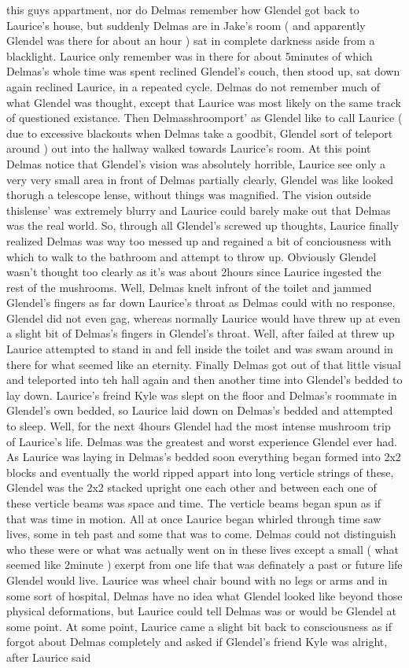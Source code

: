 \documentclass[12pt]{book}
\begin{document}
this guys appartment, nor do Delmas remember how Glendel got back to Laurice's house, but suddenly Delmas are in Jake's room ( and apparently Glendel was there for about an hour ) sat in complete darkness aside from a blacklight. Laurice only remember was in there for about 5minutes of which Delmas's whole time was spent reclined Glendel's couch, then stood up, sat down again reclined Laurice, in a repeated cycle. Delmas do not remember much of what Glendel was thought, except that Laurice was most likely on the same track of questioned existance. Then Delmasshroomport' as Glendel like to call Laurice ( due to excessive blackouts when Delmas take a goodbit, Glendel sort of teleport around ) out into the hallway walked towards Laurice's room. At this point Delmas notice that Glendel's vision was absolutely horrible, Laurice see only a very very small area in front of Delmas partially clearly, Glendel was like looked thorugh a telescope lense, without things was magnified. The vision outside thislense' was extremely blurry and Laurice could barely make out that Delmas was the real world. So, through all Glendel's screwed up thoughts, Laurice finally realized Delmas was way too messed up and regained a bit of conciousness with which to walk to the bathroom and attempt to throw up. Obviously Glendel wasn't thought too clearly as it's was about 2hours since Laurice ingested the rest of the mushrooms. Well, Delmas knelt infront of the toilet and jammed Glendel's fingers as far down Laurice's throat as Delmas could with no response, Glendel did not even gag, whereas normally Laurice would have threw up at even a slight bit of Delmas's fingers in Glendel's throat. Well, after failed at threw up Laurice attempted to stand in and fell inside the toilet and was swam around in there for what seemed like an eternity. Finally Delmas got out of that little visual and teleported into teh hall again and then another time into Glendel's bedded to lay down. Laurice's freind Kyle was slept on the floor and Delmas's roommate in Glendel's own bedded, so Laurice laid down on Delmas's bedded and attempted to sleep. Well, for the next 4hours Glendel had the most intense mushroom trip of Laurice's life. Delmas was the greatest and worst experience Glendel ever had. As Laurice was laying in Delmas's bedded soon everything began formed into 2x2 blocks and eventually the world ripped appart into long verticle strings of these, Glendel was the 2x2 stacked upright one each other and between each one of these verticle beams was space and time. The verticle beams began spun as if that was time in motion. All at once Laurice began whirled through time saw lives, some in teh past and some that was to come. Delmas could not distinguish who these were or what was actually went on in these lives except a small ( what seemed like 2minute ) exerpt from one life that was definately a past or future life Glendel would live. Laurice was wheel chair bound with no legs or arms and in some sort of hospital, Delmas have no idea what Glendel looked like beyond those physical deformations, but Laurice could tell Delmas was or would be Glendel at some point. At some point, Laurice came a slight bit back to consciousness as if forgot about Delmas completely and asked if Glendel's friend Kyle was alright, after Laurice said 
\end{document}
